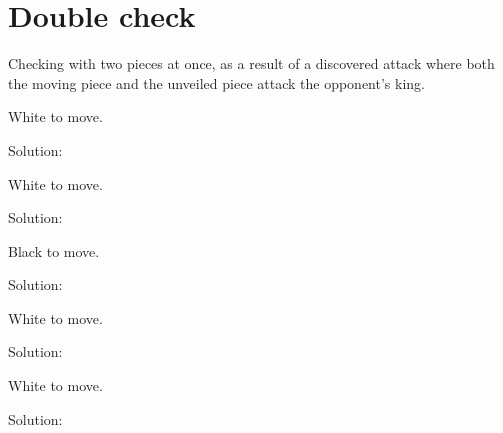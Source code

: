 \documentclass{book}
\begin{document}
\section{Double check}
Checking with two pieces at once, as a result of a discovered attack where both the moving piece and the unveiled piece attack the opponent's king.\begin{multicols}{2} 
\begin{samepage} 
\newgame 


 
\showboard
 
 White to move. 
 
Solution: 
 
\end{samepage}\begin{samepage} 
\newgame 


 
\showboard
 
 White to move. 
 
Solution: 
 
\end{samepage}\begin{samepage} 
\newgame 


 
\showboard
 
 Black to move. 
 
Solution: 
 
\end{samepage}\begin{samepage} 
\newgame 


 
\showboard
 
 White to move. 
 
Solution: 
 
\end{samepage}\begin{samepage} 
\newgame 


 
\showboard
 
 White to move. 
 
Solution: 
 
\end{samepage}\end{multicols} 
\newpage 
\end{document}
